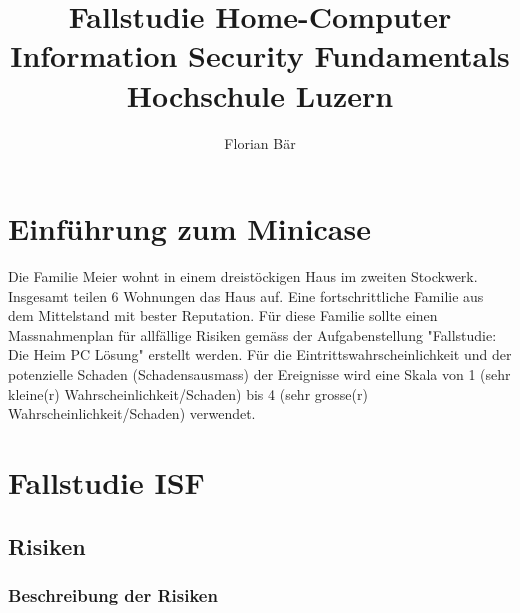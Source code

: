 \documentclass{article}
\begin{document}
\title{%
	Fallstudie Home-Computer \\
	\large Information Security Fundamentals \\
	Hochschule Luzern}

\author{Florian Bär}
\maketitle
\thispagestyle{empty}
\clearpage
\setcounter{page}{1}

\tableofcontents

\newpage

\section{Einführung zum Minicase}

Die Familie Meier wohnt in einem dreistöckigen Haus im zweiten Stockwerk. Insgesamt teilen 6 Wohnungen das Haus auf. Eine fortschrittliche Familie aus dem Mittelstand mit bester Reputation. Für diese Familie sollte einen Massnahmenplan für allfällige Risiken gemäss der Aufgabenstellung "Fallstudie: Die Heim PC Lösung" erstellt werden. Für die Eintrittswahrscheinlichkeit und der potenzielle Schaden (Schadensausmass) der Ereignisse wird eine Skala von 1 (sehr kleine(r) Wahrscheinlichkeit/Schaden) bis 4 (sehr grosse(r) Wahrscheinlichkeit/Schaden) verwendet.

\section{Fallstudie ISF}

\subsection{Risiken}

\subsubsection{Beschreibung der Risiken}
\end{document}
